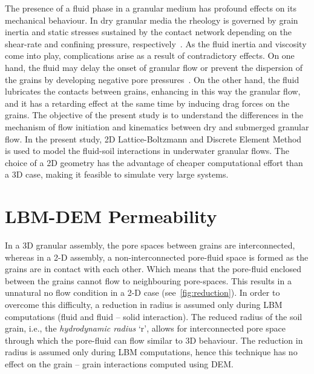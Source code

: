 The presence of a fluid phase in a granular medium has profound effects on its 
mechanical behaviour. In dry granular media the rheology is governed by grain 
inertia and static stresses sustained by the contact network depending on the 
shear-rate and confining pressure, respectively~\citep{Midi2004}. As the fluid 
inertia and viscosity come into play, complications arise as a result of 
contradictory effects. On one hand, the fluid may delay the onset of
granular flow or prevent the dispersion of the grains by
developing negative pore pressures~\citep{Pailha2008,Topin2011}. On the other
hand, the fluid lubricates the contacts between grains, enhancing in this way 
the granular flow, and it has a retarding effect at the same time by inducing 
drag forces on the grains. The objective of the present study is to understand 
the differences in the mechanism of flow initiation and kinematics between dry 
and submerged granular flow. In the present study, 2D Lattice-Boltzmann and 
Discrete Element Method is used to model the fluid-soil interactions in  
underwater granular flows.  The choice of a 2D geometry has the advantage of 
cheaper computational effort than a 3D case, making it feasible to 
simulate very large systems. 



\section{LBM-DEM Permeability}

In a 3D granular assembly, the pore spaces between grains are 
interconnected, whereas in a 2-D assembly, a non-interconnected pore-fluid 
space is formed as the grains are in contact with each 
other. Which means that the pore-fluid enclosed between the grains cannot flow 
to neighbouring pore-spaces.  This results in a unnatural no flow condition in 
a 2-D case (see~\cref{fig:reduction}). In order to overcome this difficulty, a 
reduction in radius is assumed only during LBM computations (fluid and fluid – 
solid interaction). The reduced radius of the soil grain, i.e., the 
\textit{hydrodynamic radius} `r', allows for interconnected pore space through 
which the pore-fluid can flow similar to 3D behaviour. The reduction in radius 
is assumed only during LBM computations, hence this technique has no effect on 
the grain – grain interactions computed using DEM. 


